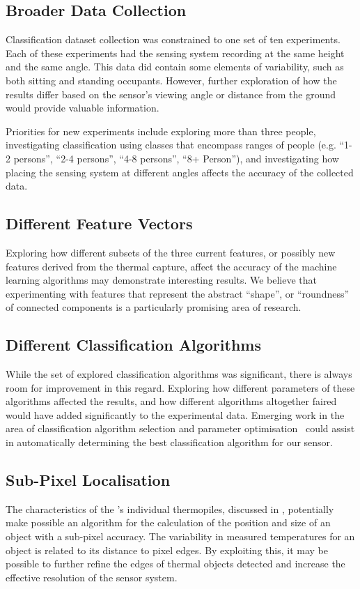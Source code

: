 \documentclass[../thesis/thesis.tex]{subfiles}
\begin{document}
\subsection{Broader Data Collection}
Classification dataset collection was constrained to one set of ten experiments. Each of these experiments had the sensing system recording at the same height and the same angle. This data did contain some elements of variability, such as both sitting and standing occupants. However, further exploration of how the results differ based on the sensor's viewing angle or distance from the ground would provide valuable information.

Priorities for new experiments include exploring more than three people, investigating classification using classes that encompass ranges of people (e.g. ``1-2 persons'', ``2-4 persons'', ``4-8 persons'', ``8+ Person''), and investigating how placing the sensing system at different angles affects the accuracy of the collected data.

\subsection{Different Feature Vectors}
Exploring how different subsets of the three current features, or possibly new features derived from the thermal capture, affect the accuracy of the machine learning algorithms may demonstrate interesting results. We believe that experimenting with features that represent the abstract ``shape'', or ``roundness'' of connected components is a particularly promising area of research.

\subsection{Different Classification Algorithms}
While the set of explored classification algorithms was significant, there is always room for improvement in this regard. Exploring how different parameters of these algorithms affected the results, and how different algorithms altogether faired would have added significantly to the experimental data. Emerging work in the area of classification algorithm selection and parameter optimisation~\cite{thornton2013auto} could assist in automatically determining the best classification algorithm for our sensor.

\subsection{Sub-Pixel Localisation}
The  characteristics of the \mlx's individual thermopiles, discussed in , potentially make possible an algorithm for the calculation of the position and size of an object with a sub-pixel accuracy. The variability in measured temperatures for an object is related to its distance to pixel edges. By exploiting this, it may be possible to further refine the edges of thermal objects detected and increase the effective resolution of the sensor system.
\end{document}
